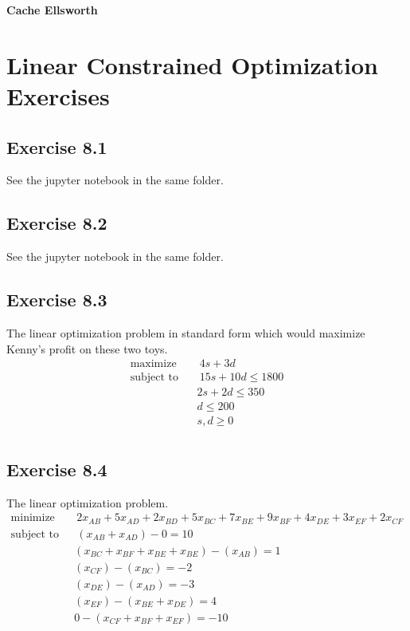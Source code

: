 \documentclass[11.5pt, letterpaper, bibtotoc,
    tablecaptionabove, figurecaptionabove]{article}
\begin{document}
\textbf{Cache Ellsworth}

\section*{Linear Constrained Optimization Exercises}

\subsection*{Exercise 8.1 }
See the jupyter notebook in the same folder.

\subsection*{Exercise 8.2}
See the jupyter notebook in the same folder.

\subsection*{Exercise 8.3}
The linear optimization problem in standard form which would maximize Kenny's profit on these two toys.
\begin{align*}
	\text{maximize}\:\:\:\:&\: 4s + 3d \\
	\text{subject to}\:\:\:\:&\: 15s + 10d \leq 1800 \\
	&2s + 2d \leq 350 \\
	&d \leq 200 \\
	&s, d \geq 0\\
\end{align*}


\subsection*{Exercise 8.4}
The linear optimization problem.
\begin{align*}
	\text{minimize}\:\:\:\: &\: 2x_{AB} + 5x_{AD} + 2x_{BD} + 5x_{BC} + 7x_{BE} +9x_{BF} + 4x_{DE} + 3x_{EF} + 2x_{CF}\\
	\text{subject to}\:\:\:\: &\: (x_{AB} + x_{AD}) - 0 = 10 \\
	&(x_{BC} + x_{BF}+ x_{BE}+ x_{BE}) - (x_{AB})= 1\\
	&(x_{CF}) - (x_{BC})= -2 \\
	&(x_{DE}) - (x_{AD})= -3\\
	&(x_{EF}) - (x_{BE}+ x_{DE})= 4\\
	&0- (x_{CF}+ x_{BF}+x_{EF})= -10\\
\end{align*}
\end{document}
